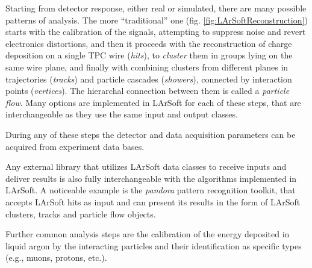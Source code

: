 Starting from detector response, either real or simulated, there are
many possible patterns of analysis. The more ``traditional'' one (fig.
\ref{fig:LArSoftReconstruction}) starts with the calibration of the
signals, attempting to suppress noise and revert electronics
distortions, and then it proceeds with the reconstruction of charge
deposition on a single TPC wire (\emph{hits}), to \emph{cluster} them in
groups lying on the same wire plane, and finally with combining clusters
from different planes in trajectories (\emph{tracks}) and particle
cascades (\emph{showers}), connected by interaction points
(\emph{vertices}). The hierarchal connection between them is called a
\emph{particle flow}. Many options are implemented in LArSoft for each
of these steps, that are interchangeable as they use the same input and
output classes.

During any of these steps the detector and data acquisition parameters
can be acquired from experiment data bases.

Any external library that utilizes LArSoft data classes to receive
inputs and deliver results is also fully interchangeable with the
algorithms implemented in LArSoft. A noticeable example is the
\emph{pandora} pattern recognition toolkit, that accepts LArSoft hits as
input and can present its results in the form of LArSoft clusters,
tracks and particle flow objects.

Further common analysis steps are the calibration of the energy
deposited in liquid argon by the interacting particles and their
identification as specific types (e.g., muons, protons, etc.).

